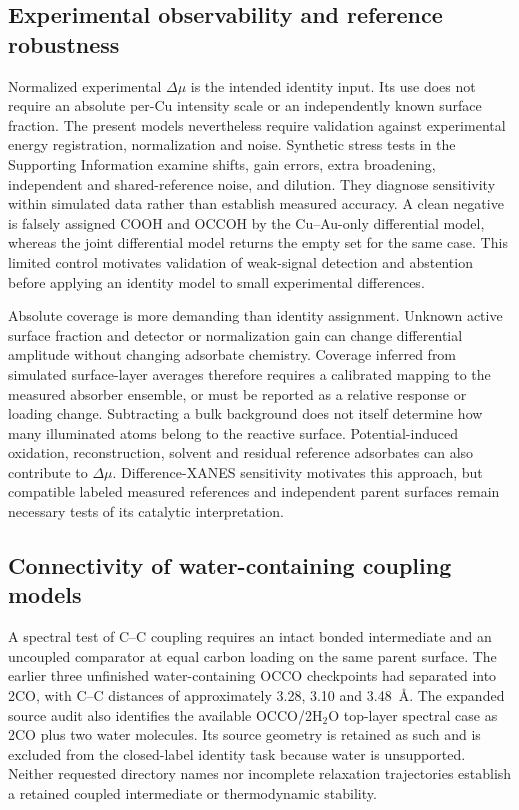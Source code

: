 \documentclass[11pt,a4paper]{article}
\begin{document}
\subsection{Experimental observability and reference robustness}
Normalized experimental $\Delta\mu$ is the intended identity input. Its use does not require an absolute per-Cu intensity scale or an independently known surface fraction. The present models nevertheless require validation against experimental energy registration, normalization and noise. Synthetic stress tests in the Supporting Information examine shifts, gain errors, extra broadening, independent and shared-reference noise, and dilution. They diagnose sensitivity within simulated data rather than establish measured accuracy. A clean negative is falsely assigned COOH and OCCOH by the Cu--Au-only differential model, whereas the joint differential model returns the empty set for the same case. This limited control motivates validation of weak-signal detection and abstention before applying an identity model to small experimental differences.

Absolute coverage is more demanding than identity assignment. Unknown active surface fraction and detector or normalization gain can change differential amplitude without changing adsorbate chemistry. Coverage inferred from simulated surface-layer averages therefore requires a calibrated mapping to the measured absorber ensemble, or must be reported as a relative response or loading change. Subtracting a bulk background does not itself determine how many illuminated atoms belong to the reactive surface. Potential-induced oxidation, reconstruction, solvent and residual reference adsorbates can also contribute to $\Delta\mu$. Difference-XANES sensitivity motivates this approach,\cite{ramaker2010,ramaker2014} but compatible labeled measured references and independent parent surfaces remain necessary tests of its catalytic interpretation.

\subsection{Connectivity of water-containing coupling models}
A spectral test of C--C coupling requires an intact bonded intermediate and an uncoupled comparator at equal carbon loading on the same parent surface. The earlier three unfinished water-containing OCCO checkpoints had separated into 2CO, with C--C distances of approximately 3.28, 3.10 and 3.48~\AA. The expanded source audit also identifies the available OCCO/2H$_2$O top-layer spectral case as 2CO plus two water molecules. Its source geometry is retained as such and is excluded from the closed-label identity task because water is unsupported. Neither requested directory names nor incomplete relaxation trajectories establish a retained coupled intermediate or thermodynamic stability.
\end{document}
